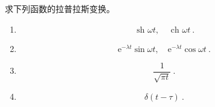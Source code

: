 \begin{exercise}{}
求下列函数的拉普拉斯变换。

\begin{enumerate}
\item \begin{equation}
\text { sh } \omega t, \quad \text { ch } \omega t~.
\end{equation}
\item \begin{equation}
\mathrm{e}^{-\lambda t} \sin \omega t, \quad \mathrm{e}^{-\lambda t} \cos \omega t~.
\end{equation}
\item \begin{equation}
\frac{1}{\sqrt{\pi t}}~.
\end{equation}
\item \begin{equation}
\delta(t-\tau)~.
\end{equation}
\end{enumerate}
\end{exercise}